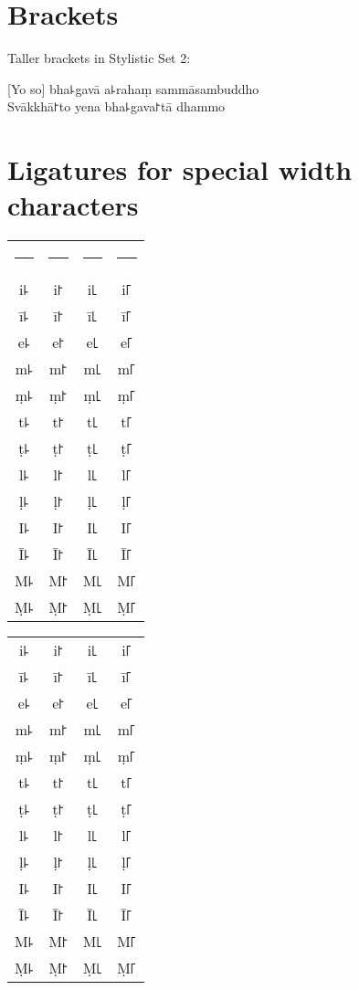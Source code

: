 \documentclass[11pt,a4paper]{article}
\newlength\vruleHeight
\newcommand\vr{\rule{0.1pt}{\vruleHeight}}
\begin{document}
\thispagestyle{empty}\mbox{}

\section{Brackets}

Taller brackets in Stylistic Set 2:

[Yo so] bha꜕gavā a꜕rahaṃ sammāsambuddho\\
Svākkhā꜓to yena bha꜕gava꜓tā dhammo

\section{Ligatures for special width characters}


\begin{multicols}{2}
  
\setlength{\vruleHeight}{230pt}

\begin{tabular}{cccc}
\vr & \vr & \vr & \vr\vspace*{-\vruleHeight}\\
i꜕ & i꜓ & i꜖ & i꜒\\
ī꜕ & ī꜓ & ī꜖ & ī꜒\\
e꜕ & e꜓ & e꜖ & e꜒\\
m꜕ & m꜓ & m꜖ & m꜒\\
ṃ꜕ & ṃ꜓ & ṃ꜖ & ṃ꜒\\
t꜕ & t꜓ & t꜖ & t꜒\\
ṭ꜕ & ṭ꜓ & ṭ꜖ & ṭ꜒\\
l꜕ & l꜓ & l꜖ & l꜒\\
ḷ꜕ & ḷ꜓ & ḷ꜖ & ḷ꜒\\
I꜕ & I꜓ & I꜖ & I꜒\\
Ī꜕ & Ī꜓ & Ī꜖ & Ī꜒\\
M꜕ & M꜓ & M꜖ & M꜒\\
Ṃ꜕ & Ṃ꜓ & Ṃ꜖ & Ṃ꜒\\
\end{tabular}

\columnbreak

{\itshape

\begin{tabular}{cccc}
i꜕ & i꜓ & i꜖ & i꜒\\
ī꜕ & ī꜓ & ī꜖ & ī꜒\\
e꜕ & e꜓ & e꜖ & e꜒\\
m꜕ & m꜓ & m꜖ & m꜒\\
ṃ꜕ & ṃ꜓ & ṃ꜖ & ṃ꜒\\
t꜕ & t꜓ & t꜖ & t꜒\\
ṭ꜕ & ṭ꜓ & ṭ꜖ & ṭ꜒\\
l꜕ & l꜓ & l꜖ & l꜒\\
ḷ꜕ & ḷ꜓ & ḷ꜖ & ḷ꜒\\
I꜕ & I꜓ & I꜖ & I꜒\\
Ī꜕ & Ī꜓ & Ī꜖ & Ī꜒\\
M꜕ & M꜓ & M꜖ & M꜒\\
Ṃ꜕ & Ṃ꜓ & Ṃ꜖ & Ṃ꜒\\
\end{tabular}

}

\end{multicols}
\end{document}
